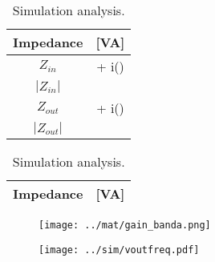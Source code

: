 \begin{table}[H]
    \begin{minipage}{.5\textwidth}
    \centering
    \vspace{3mm}
    \begin{table}[H]
    \centering
    \begin{tabular}{|c|c|}
    	\hline
        Impedance &  [VA]\\ 
        \hline
        $Z_{in}$ &  + i()\\ \hline
        $|Z_{in}|$ & \\ \hline
        $Z_{out}$ &  + i()\\ \hline
        $|Z_{out}|$ & \\ \hline
    \end{tabular}
	\end{table}
    \caption{Theoretical analysis.}
    \end{minipage}
    \begin{minipage}{.5\textwidth}
     \begin{table}[H]
    \centering 
    \begin{tabular}{|c|c|}
    	\hline
    	Impedance & [VA]\\ 
    	\hline
         
         
    \end{tabular}
	\end{table}
	\caption{Simulation analysis.} 
    \end{minipage}
\end{table}

\begin{table}[H]
    \begin{minipage}{.5\textwidth}
    \centering
    \begin{figure}[H]
    \centering
    \texttt{[image: ../mat/gain\_banda.png]}
	\end{figure}
    \caption{Theoretical analysis.}
    \end{minipage}
    \begin{minipage}{.5\textwidth}
	\begin{figure}[H]
    \centering
    \texttt{[image: ../sim/voutfreq.pdf]}
	\end{figure}
	\caption{Simulation analysis.} 
    \end{minipage}
\end{table}

